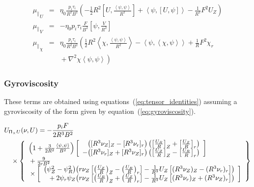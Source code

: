 \documentclass[letterpaper]{book}
\newcommand{\tensor}[1]{\mathsf{#1}}
\renewcommand{\P}{\tensor{\Pi}}
\newcommand{\lp}[1]{\nabla^2 #1}
\newcommand{\pb}[2]{\left[#1,#2\right]}
\newcommand{\ip}[2]{\left\langle  #1,#2\right\rangle}
\begin{document}
\begin{eqnarray*}
  {\mu_\parallel}_U & = & \eta_0 \frac{p_i \tau_i}{R^2 B^2} \left( 
  - \frac{1}{2} R^2 \pb{U}{\frac{\ip{\psi}{\psi}}{R^2}}
  + \ip{\psi}{\pb{U}{\psi}}
  - \frac{1}{R^2} F^2 U_Z \right)
  \\
  {\mu_\parallel}_V & = & -\eta_0 p_i \tau_i \frac{F}{B^2} 
  \pb{\psi}{\frac{V}{R^2}}
  \\
  {\mu_\parallel}_\chi & = & \eta_0 \frac{p_i \tau_i}{R^2 B^2} \left(
    \frac{1}{2} R^2 \ip{\chi}{\frac{\ip{\psi}{\psi}}{R^2}}
  - \ip{\psi}{\ip{\chi}{\psi}}
  + \frac{1}{R} F^2 \chi_r 
  \right.\\ && \left. \mbox{}
  + \lp{\chi} \ip{\psi}{\psi}
  \right)
\end{eqnarray*}


\subsubsection{Gyroviscosity}

These terms are obtained using equations~(\ref{eq:tensor_identities})
assuming a gyroviscosity of the form given by
equation~(\ref{eq:gyroviscosity}).

\begin{eqnarray*}
  & \lefteqn{U_{\P_\times U}(\nu, U) = -\frac{p_i F}{2 R^3 B^2}} & 
  \\ & & \mbox{} \times
    \left\{ \begin{array}{l} 
      \left(1+\frac{3}{2 R^2}\frac{\ip{\psi}{\psi}}{B^2}\right)
      \left[ \begin{array}{r@{}l}
	     & \left( [R^3 \nu_Z]_Z - [R^3 \nu_r]_r \right)
	       \left( \left[\frac{U_R}{R}\right]_Z 
	            + \left[\frac{U_Z}{R}\right]_r \right) 
             \\ \mbox{}
	   - & \left( [R^3 \nu_r]_Z + [R^3 \nu_Z]_r \right)
	       \left( \left[\frac{U_Z}{R}\right]_Z 
	            - \left[\frac{U_R}{R}\right]_r \right) 
	     \end{array} \right]
       \\ \mbox{}
      + \frac{9}{2 r B^2} 
      \\ \mbox{} \times \left[ 
	\begin{array}{r@{}l}
	  \left( \psi_Z^2 - \psi_R^2 \right) &
	  \left( r \nu_Z \left[ 
	    \left( \frac{U_Z}{R} \right)_Z -
	    \left( \frac{U_R}{R} \right)_r \right]
          -\frac{1}{R^3} U_Z \left[ 
	    (R^3 \nu_Z)_Z - (R^3 \nu_r)_r \right] \right)
	  \\ 
	  \mbox{} + 2 \psi_r \psi_Z &
          \left( r \nu_Z \left[ 
	    \left( \frac{U_R}{R} \right)_Z +
	    \left( \frac{U_Z}{R} \right)_r \right]
          -\frac{1}{R^3} U_Z \left[ 
	    (R^3 \nu_r)_Z + (R^3 \nu_Z)_r \right] \right)
	  \end{array} \right] 
    \end{array} \right\}
\end{eqnarray*}
\end{document}
